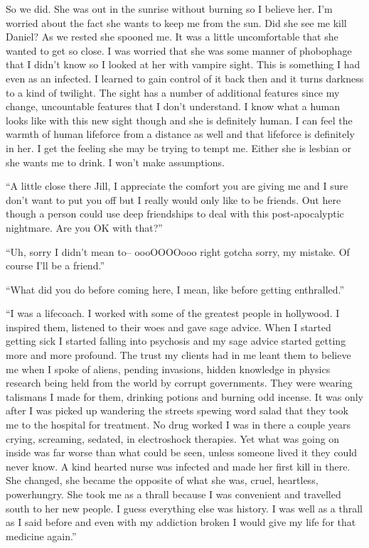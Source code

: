 So we did. She was out in the sunrise without burning so I believe her. I'm worried about the fact she wants to keep me from the sun. Did she see me kill Daniel? As we rested she spooned me. It was a little uncomfortable that she wanted to get so close. I was worried that she was some manner of phobophage that I didn't know so I looked at her with vampire sight. This is something I had even as an infected. I learned to gain control of it back then and it turns darkness to a kind of twilight. The sight has a number of additional features since my change, uncountable features that I don't understand. I know what a human looks like with this new sight though and she is definitely human. I can feel the warmth of human lifeforce from a distance as well and that lifeforce is definitely in her. I get the feeling she may be trying to tempt me. Either she is lesbian or she wants me to drink. I won't make assumptions.

``A little close there Jill, I appreciate the comfort you are giving me and I sure don't want to put you off but I really would only like to be friends. Out here though a person could use deep friendships to deal with this post-apocalyptic nightmare. Are you OK with that?''

``Uh, sorry I didn't mean to-- oooOOOOooo right gotcha sorry, my mistake. Of course I'll be a friend.''

``What did you do before coming here, I mean, like before getting enthralled.''

``I was a lifecoach. I worked with some of the greatest people in hollywood. I inspired them, listened to their woes and gave sage advice. When I started getting sick I started falling into psychosis and my sage advice started getting more and more profound. The trust my clients had in me leant them to believe me when I spoke of aliens, pending invasions, hidden knowledge in physics research being held from the world by corrupt governments. They were wearing talismans I made for them, drinking potions and burning odd incense. It was only after I was picked up wandering the streets spewing word salad that they took me to the hospital for treatment. No drug worked I was in there a couple years crying, screaming, sedated, in electroshock therapies. Yet what was going on inside was far worse than what could be seen, unless someone lived it they could never know. A kind hearted nurse was infected and made her first kill in there. She changed, she became the opposite of what she was, cruel, heartless, powerhungry. She took me as a thrall because I was convenient and travelled south to her new people. I guess everything else was history. I was well as a thrall as I said before and even with my addiction broken I would give my life for that medicine again.''

